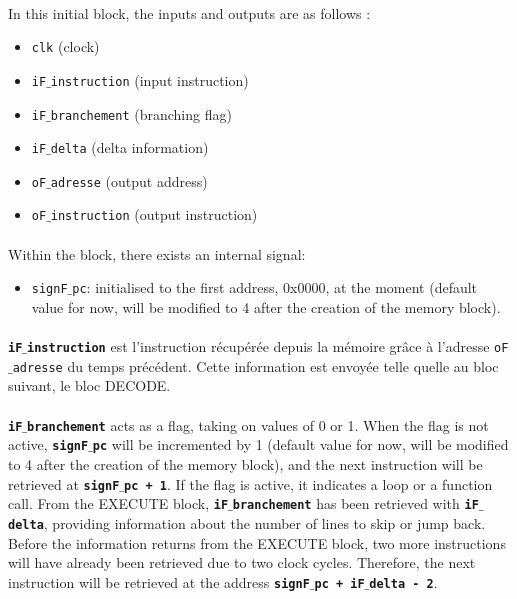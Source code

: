 \documentclass{article}
\begin{document}
\paragraph{}In this initial block, the inputs and outputs are as follows : 

\begin{itemize}
\item \texttt{clk} (clock)
\item \texttt{iF$\_$instruction} (input instruction)
\item \texttt{iF$\_$branchement} (branching flag)
\item \texttt{iF$\_$delta} (delta information)
\item \texttt{oF$\_$adresse} (output address)
\item \texttt{oF$\_$instruction} (output instruction)
\end{itemize}


\paragraph{}Within the block, there exists an internal signal:
\begin{itemize}
\item \texttt{signF$\_$pc}: initialised to the first address, 0x0000, at the moment (default value for now, will be modified to 4 after the creation of the memory block).
\end{itemize}

\paragraph{}\textbf{\texttt{iF$\_$instruction}} est l’instruction récupérée depuis la mémoire grâce à l’adresse \texttt{oF$\_$adresse} du temps précédent. Cette information est envoyée telle quelle au bloc suivant, le bloc DECODE. 

\paragraph{}\textbf{\texttt{iF$\_$branchement}} acts as a flag, taking on values of 0 or 1. 
When the flag is not active, \textbf{\texttt{signF$\_$pc}} will be incremented by 1 (default value for now, will be modified to 4 after the creation of the memory block), and the next instruction will be retrieved at \textbf{\texttt{signF$\_$pc + 1}}. 
If the flag is active, it indicates a loop or a function call. From the EXECUTE block, \textbf{\texttt{iF$\_$branchement}} has been retrieved with \textbf{\texttt{iF$\_$delta}}, providing information about the number of lines to skip or jump back. Before the information returns from the EXECUTE block, two more instructions will have already been retrieved due to two clock cycles. Therefore, the next instruction will be retrieved at the address \textbf{\texttt{signF$\_$pc + iF$\_$delta - 2}}.
\end{document}
